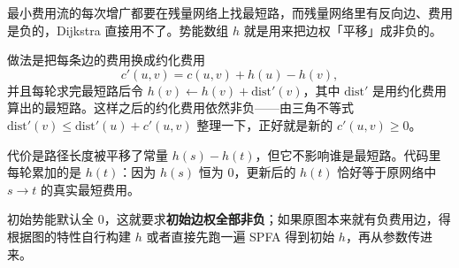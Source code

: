 最小费用流的每次增广都要在残量网络上找最短路，而残量网络里有反向边、费用是负的，Dijkstra 直接用不了。势能数组 $h$ 就是用来把边权「平移」成非负的。

做法是把每条边的费用换成约化费用
\[ c'(u,v)=c(u,v)+h(u)-h(v), \]
并且每轮求完最短路后令 $h(v)\leftarrow h(v)+\mathrm{dist}'(v)$，其中 $\mathrm{dist}'$ 是用约化费用算出的最短路。这样之后的约化费用依然非负——由三角不等式 $\mathrm{dist}'(v)\le \mathrm{dist}'(u)+c'(u,v)$ 整理一下，正好就是新的 $c'(u,v)\ge0$。

代价是路径长度被平移了常量 $h(s)-h(t)$，但它不影响谁是最短路。代码里每轮累加的是 $h(t)$：因为 $h(s)$ 恒为 $0$，更新后的 $h(t)$ 恰好等于原网络中 $s\to t$ 的真实最短费用。

初始势能默认全 $0$，这就要求\textbf{初始边权全部非负}；如果原图本来就有负费用边，得根据图的特性自行构建 $h$ 或者直接先跑一遍 SPFA 得到初始 $h$，再从参数传进来。
